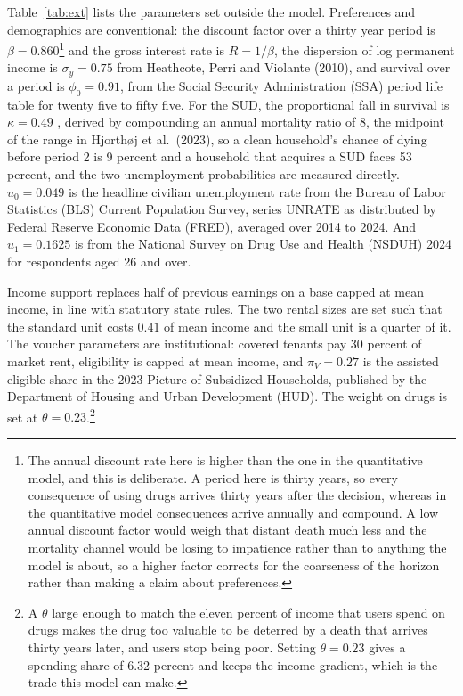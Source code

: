 \documentclass[10pt]{article}
\begin{document}
Table~\ref{tab:ext} lists the parameters set outside the model. Preferences and
demographics are conventional: the discount factor over a thirty year period
is $\beta = 0.860$\footnote{The annual discount rate here is higher than the one in the
quantitative model, and this is deliberate. A period here is thirty years, so
every consequence of using drugs arrives thirty years after the decision,
whereas in the quantitative model consequences arrive annually and compound. A
low annual discount factor would weigh that distant death much less and the
mortality channel would be losing to impatience rather than to anything the model
is about, so a higher factor corrects for the coarseness of the horizon rather
than making a claim about preferences.} and the gross interest rate is
$R=1/\beta$, the dispersion of log permanent income is
$\sigma_y = 0.75$ from Heathcote, Perri and Violante (2010), and survival over
a period is $\phi_0 = 0.91$, from the Social Security Administration (SSA) period life table for twenty
five to fifty five. For the SUD, the
proportional fall in survival is $\kappa = 0.49$ , derived by compounding an annual mortality ratio of $8$, the midpoint of the range in Hjorth\o j et al.\
(2023), so a clean household's chance of dying before period 2 is 9
percent and a household that acquires a SUD faces 53 percent,
and the two unemployment probabilities are measured directly. $u_0 = 0.049$
is the headline civilian unemployment rate from the Bureau of Labor Statistics
(BLS) Current Population Survey, series UNRATE as distributed by Federal Reserve
Economic Data (FRED), averaged over 2014 to 2024. And $u_1 = 0.1625$ is from the
National Survey on Drug Use and Health (NSDUH) 2024 for respondents aged 26 and
over.

Income support replaces half of previous earnings on a base capped at mean
income, in line with statutory state rules. The two rental sizes are set
such that the standard unit costs $0.41$ of mean income and the small unit is a
quarter of it. The voucher parameters are institutional: covered
tenants pay $30$ percent of market rent, eligibility is capped at mean income,
and $\pi_V = 0.27$ is the assisted eligible share in the 2023 Picture of Subsidized
Households, published by the Department of Housing and Urban Development (HUD).
The weight on drugs is set at $\theta = 0.23$.\footnote{A $\theta$ large
enough to match the eleven percent of income that users spend on drugs makes the
drug too valuable to be deterred by a death that arrives thirty years later, and
users stop being poor. Setting $\theta = 0.23$ gives a spending share of
6.32 percent and keeps the income gradient, which is the trade this model
can make.}
\end{document}
